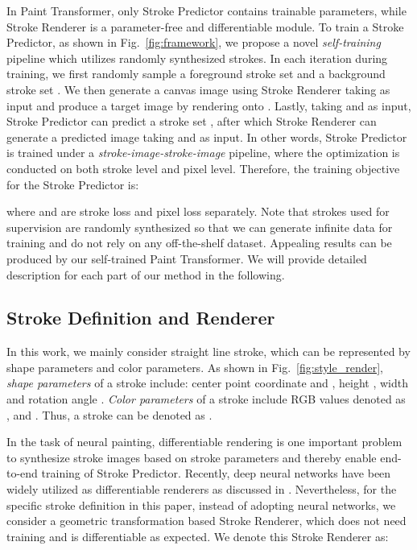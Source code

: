 \documentclass[10pt,twocolumn,letterpaper]{article}
\begin{document}
In Paint Transformer, only Stroke Predictor contains trainable parameters, while Stroke Renderer is a parameter-free and differentiable module. 
To train a Stroke Predictor, as shown in Fig.~\ref{fig:framework}, we propose a novel \emph{self-training} pipeline which utilizes randomly synthesized strokes. 
In each iteration during training, we first randomly sample a foreground stroke set  and a background stroke set . We then generate a canvas image  using Stroke Renderer taking as input  and produce a target image  by rendering  onto . Lastly, taking  and  as input, Stroke Predictor can predict a stroke set , after which Stroke Renderer can generate a predicted image  taking  and  as input. 
In other words, Stroke Predictor is trained under a \emph{stroke-image-stroke-image} pipeline, where the optimization is conducted on both stroke level and pixel level.
Therefore, the training objective for the Stroke Predictor is:


where  and  are stroke loss and pixel loss separately.
Note that strokes used for supervision are randomly synthesized so that we can generate infinite data for training and do not rely on any off-the-shelf dataset.
Appealing results can be produced by our self-trained Paint Transformer. We will provide detailed description for each part of our method in the following.








\subsection{Stroke Definition and Renderer}

In this work, we mainly consider straight line stroke, which can be represented by shape parameters and color parameters.
As shown in Fig.~\ref{fig:style_render}, \emph{shape parameters} of a stroke include: center point coordinate  and , height , width  and rotation angle .
\emph{Color parameters} of a stroke include RGB values denoted as ,  and .
Thus, a stroke  can be denoted as .

In the task of neural painting, differentiable rendering is one important problem to synthesize stroke images based on stroke parameters and thereby enable end-to-end training of Stroke Predictor. 
Recently, deep neural networks have been widely utilized as differentiable renderers as discussed in \cite{kato2020differentiable}. 
Nevertheless, for the specific stroke definition in this paper, instead of adopting neural networks, we consider a geometric transformation based Stroke Renderer, which does not need training and is differentiable as expected. We denote this Stroke Renderer as:
\end{document}
